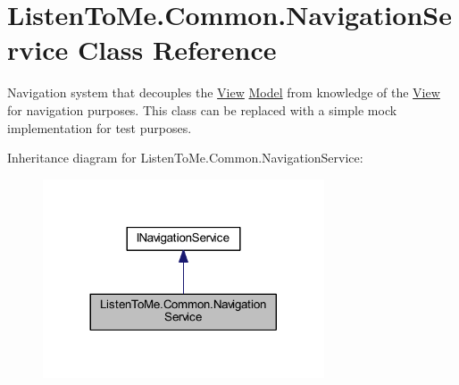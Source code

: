 \hypertarget{class_listen_to_me_1_1_common_1_1_navigation_service}{}\section{Listen\+To\+Me.\+Common.\+Navigation\+Service Class Reference}
\label{class_listen_to_me_1_1_common_1_1_navigation_service}


Navigation system that decouples the \hyperlink{namespace_listen_to_me_1_1_view}{View} \hyperlink{namespace_listen_to_me_1_1_model}{Model} from knowledge of the \hyperlink{namespace_listen_to_me_1_1_view}{View} for navigation purposes. This class can be replaced with a simple mock implementation for test purposes.  




Inheritance diagram for Listen\+To\+Me.\+Common.\+Navigation\+Service\+:\nopagebreak
\begin{figure}[H]
\begin{center}
\leavevmode
\includegraphics[width=236pt]{class_listen_to_me_1_1_common_1_1_navigation_service__inherit__graph}
\end{center}
\end{figure}
